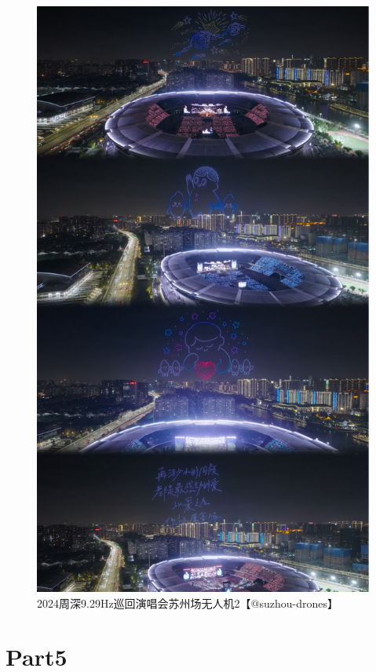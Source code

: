 \documentclass[]{ctexbook}
\begin{document}
\begin{figure}

{\centering \includegraphics[width=400pt]{img/suzhou20241109/002} 

}

\caption{2024周深9.29Hz巡回演唱会苏州场无人机2【@suzhou-drones】}\label{fig:unnamed-chunk-130}
\end{figure}

\section{Part5}\label{suzhou-20241109-part5}
\end{document}
